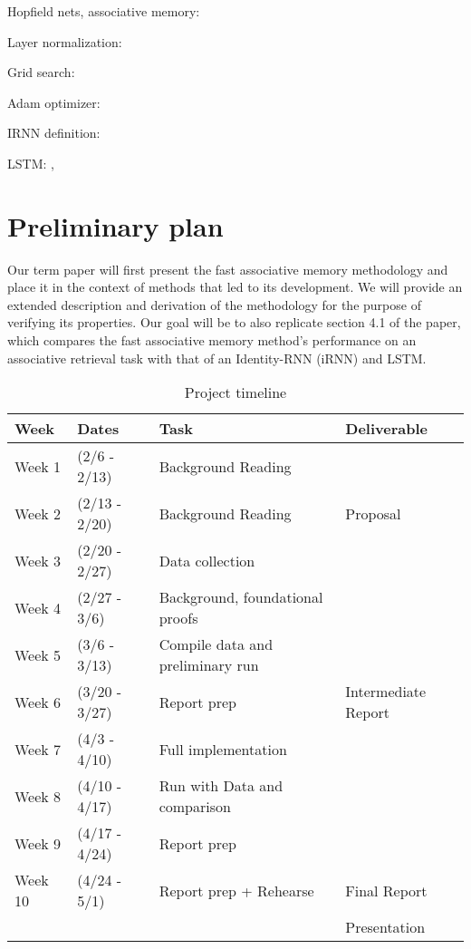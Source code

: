 Hopfield nets, associative memory: \cite{Mackay03informationtheory}

Layer normalization: \cite{1607.06450}

Grid search: \cite{Goodfellow-et-al-2016}

Adam optimizer: \cite{1412.6980}

IRNN definition: \cite{1511.03771}

LSTM: \cite{DBLP:journals/neco/GersSC00}, \cite{hochreiter1997}

\section{Preliminary plan}

Our term paper will first present the fast associative memory methodology and place it in the context of methods that led to its development. We will provide an extended description and derivation of the methodology for the purpose of verifying its properties. Our goal will be to also replicate section 4.1 of the paper, which compares the fast associative memory method's performance on an associative retrieval task with that of an Identity-RNN (iRNN) and LSTM.


\begin{table*}[t]
  \caption{Project timeline}
  \label{tab:freq}
  \begin{tabular}{llll}
    \toprule
    Week & Dates & Task & Deliverable\\
    \midrule
    Week 1 & (2/6   - 2/13) & Background Reading & \\
    Week 2 & (2/13  - 2/20) & Background Reading & Proposal\\
    Week 3 & (2/20  - 2/27) & Data collection & \\
    Week 4 & (2/27  - 3/6)  & Background, foundational proofs & \\
    Week 5 & (3/6   - 3/13) & Compile data and preliminary run & \\
    Week 6 & (3/20  - 3/27) & Report prep & Intermediate Report\\
    Week 7 & (4/3   - 4/10) & Full implementation & \\
    Week 8 & (4/10  - 4/17) & Run with Data and comparison & \\
    Week 9 & (4/17  - 4/24) & Report prep & \\
    Week 10 & (4/24 - 5/1) & Report prep + Rehearse & Final Report \\
    & & & Presentation\\
  \bottomrule
\end{tabular}
\end{table*}
